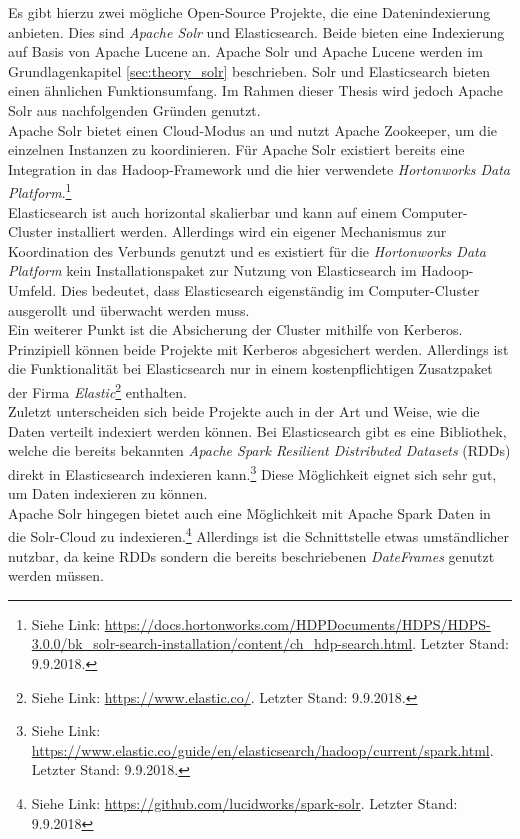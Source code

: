 \noindent 
Es gibt hierzu zwei mögliche Open-Source Projekte, die eine Datenindexierung anbieten. Dies sind \textit{Apache Solr\texttrademark} und Elasticsearch\texttrademark. Beide bieten eine Indexierung auf Basis von Apache Lucene an. Apache Solr und Apache Lucene werden im Grundlagenkapitel \ref{sec:theory_solr} beschrieben. Solr und Elasticsearch bieten einen ähnlichen Funktionsumfang. Im Rahmen dieser Thesis wird jedoch Apache Solr aus nachfolgenden Gründen genutzt.\\
Apache Solr bietet einen Cloud-Modus an und nutzt Apache Zookeeper, um die einzelnen Instanzen zu koordinieren. Für Apache Solr existiert bereits eine Integration in das Hadoop-Framework und die hier verwendete \textit{Hortonworks Data Platform}.\footnote{Siehe Link: \url{https://docs.hortonworks.com/HDPDocuments/HDPS/HDPS-3.0.0/bk_solr-search-installation/content/ch_hdp-search.html}. Letzter Stand: 9.9.2018.}\\
Elasticsearch ist auch horizontal skalierbar und kann auf einem Computer-Cluster installiert werden. Allerdings wird ein eigener Mechanismus zur Koordination des Verbunds genutzt und es existiert für die \textit{Hortonworks Data Platform} kein Installationspaket zur Nutzung von Elasticsearch im Hadoop-Umfeld. Dies bedeutet, dass Elasticsearch eigenständig im Computer-Cluster ausgerollt und überwacht werden muss.\\

\noindent
Ein weiterer Punkt ist die Absicherung der Cluster mithilfe von Kerberos. Prinzipiell können beide Projekte mit Kerberos abgesichert werden. Allerdings ist die Funktionalität bei Elasticsearch nur in einem kostenpflichtigen Zusatzpaket der Firma \textit{Elastic}\footnote{Siehe Link: \url{https://www.elastic.co/}. Letzter Stand: 9.9.2018.} enthalten.\\

\noindent
Zuletzt unterscheiden sich beide Projekte auch in der Art und Weise, wie die Daten verteilt indexiert werden können. Bei Elasticsearch gibt es eine Bibliothek, welche die bereits bekannten \textit{Apache Spark Resilient Distributed Datasets} (RDDs) direkt in Elasticsearch indexieren kann.\footnote{Siehe Link: \url{https://www.elastic.co/guide/en/elasticsearch/hadoop/current/spark.html}. Letzter Stand: 9.9.2018.} Diese Möglichkeit eignet sich sehr gut, um Daten indexieren zu können.\\
Apache Solr hingegen bietet auch eine Möglichkeit mit Apache Spark Daten in die Solr-Cloud zu indexieren.\footnote{Siehe Link: \url{https://github.com/lucidworks/spark-solr}. Letzter Stand: 9.9.2018} Allerdings ist die Schnittstelle etwas umständlicher nutzbar, da keine RDDs sondern die bereits beschriebenen \textit{DateFrames} genutzt werden müssen.\\


